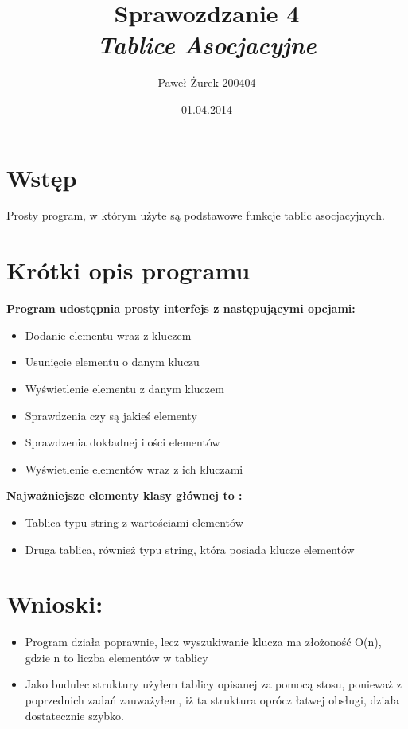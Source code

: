 \documentclass[10 pt]{article}
\title{Sprawozdzanie 4 \\ \emph{\textbf{Tablice Asocjacyjne}}}
\author{Paweł Żurek 200404}
\date{01.04.2014}
\begin{document}
\tableofcontents
\maketitle
\section{Wstęp}
Prosty program, w którym użyte są podstawowe funkcje tablic asocjacyjnych.
\section{Krótki opis programu}
\textbf{Program udostępnia prosty interfejs z następującymi opcjami: }
\begin{itemize}
\item Dodanie elementu wraz z kluczem
\item Usunięcie elementu o danym kluczu
\item Wyświetlenie elementu z danym kluczem
\item Sprawdzenia czy są jakieś elementy
\item Sprawdzenia dokładnej ilości elementów
\item Wyświetlenie elementów wraz z ich kluczami
\end{itemize}

\textbf{Najważniejsze elementy klasy głównej to : }
\begin{itemize}
\item Tablica typu string z wartościami elementów
\item Druga tablica, również typu string, która posiada klucze elementów
\end{itemize}

\section{Wnioski:}
\begin{itemize}
\item Program działa poprawnie, lecz wyszukiwanie klucza ma złożoność O(n), gdzie n to liczba elementów w tablicy
\item Jako budulec struktury użyłem tablicy opisanej za pomocą stosu, ponieważ z poprzednich zadań zauważyłem, iż ta struktura oprócz łatwej obsługi, działa dostatecznie szybko.

\end{itemize}
\end{document}
